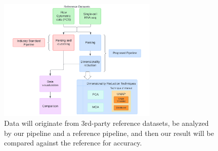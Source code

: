\documentclass[10pt,letterpaper]{article}
\begin{document}
\begin{figure}[h]
  \begin{minipage}[b]{3in}
  \centering
    \includegraphics[width=3in]{whpc_data_diagram}
    \caption{Data will originate from 3rd-party reference datasets, be analyzed by our pipeline and a reference pipeline, and then our result will be compared against the reference for accuracy.}
    \label{fig:datadiagram}
  \end{minipage}
\end{figure}


\newgeometry{}
\printbibliography
\end{document}
